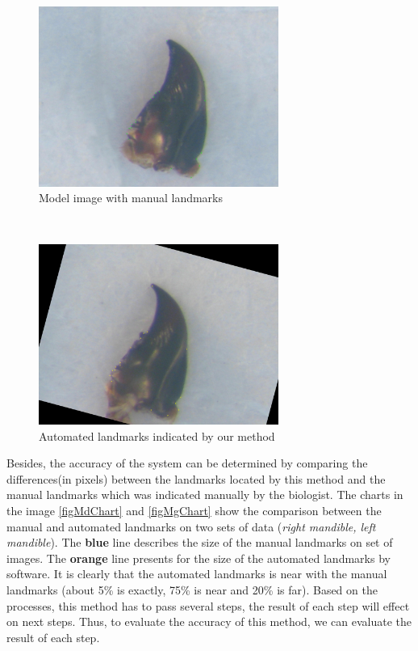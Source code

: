 \begin{figure}[h!]
\centering
\includegraphics[width=0.7\textwidth]{./images/manualLM}
\caption{Model image with manual landmarks}
\label{figmanualLM}
\end{figure}~\\[0.2cm]
\begin{figure}[h!]
\centering
\includegraphics[width=0.7\textwidth]{./images/est32}
\caption{Automated landmarks indicated by our method}
\label{figestimatedLM}
\end{figure}
Besides, the accuracy of the system can be determined by comparing the differences(in pixels) between the landmarks located by this method and the manual landmarks which was indicated manually by the biologist. The charts in the image \ref{figMdChart} and \ref{figMgChart} show the comparison between the manual and automated landmarks on two sets of data (\textit{right mandible, left mandible}). The \textbf{blue} line describes the size of the manual landmarks on set of images. The \textbf{orange} line presents for the size of the automated landmarks by software. It is clearly that the automated landmarks is near with the manual landmarks (about 5\% is exactly, 75\% is near and 20\% is far). Based on the processes, this method has to pass several steps, the result of each step will effect on next steps. Thus, to evaluate the accuracy of this method, we can evaluate the result of each step.
